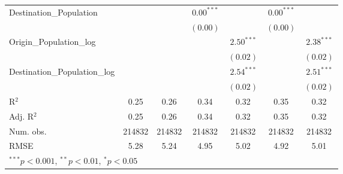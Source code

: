 \begin{table}
\begin{center}
\begin{tabular}{l c c c c c c }
			Destination\_Population      &               &               & $0.00^{***}$  &                & $0.00^{***}$  &                \\
			&               &               & $(0.00)$      &                & $(0.00)$      &                \\
			Origin\_Population\_log      &               &               &               & $2.50^{***}$   &               & $2.38^{***}$   \\
			&               &               &               & $(0.02)$       &               & $(0.02)$       \\
			Destination\_Population\_log &               &               &               & $2.54^{***}$   &               & $2.51^{***}$   \\
			&               &               &               & $(0.02)$       &               & $(0.02)$       \\
			\hline
			R$^2$                        & 0.25          & 0.26          & 0.34          & 0.32           & 0.35          & 0.32           \\
			Adj. R$^2$                   & 0.25          & 0.26          & 0.34          & 0.32           & 0.35          & 0.32           \\
			Num. obs.                    & 214832        & 214832        & 214832        & 214832         & 214832        & 214832         \\
			RMSE                         & 5.28          & 5.24          & 4.95          & 5.02           & 4.92          & 5.01           \\
			\hline
			\multicolumn{7}{l}{\scriptsize{$^{***}p<0.001$, $^{**}p<0.01$, $^*p<0.05$}}
		\end{tabular}
	\label{table:Gravity2014Q2}
	\end{center}
\end{table}


